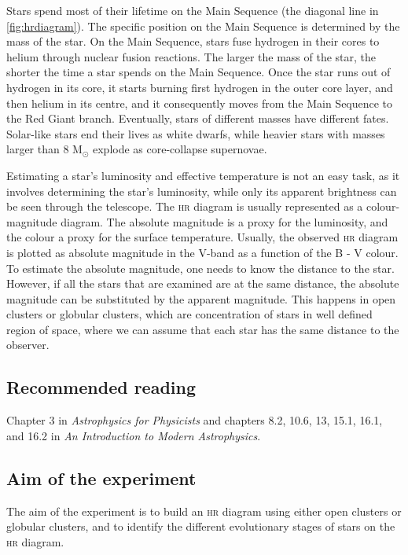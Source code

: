 \documentclass[a4paper, 11pt, fleqn]{memoir}
\begin{document}
Stars spend most of their lifetime on the Main Sequence (the diagonal line in \cref{fig:hrdiagram}).
The specific position on the Main Sequence is determined by the mass of the star.
On the Main Sequence, stars fuse hydrogen in their cores to helium through nuclear fusion reactions.
The larger the mass of the star, the shorter the time a star spends on the Main Sequence.
Once the star runs out of hydrogen in its core, it starts burning first hydrogen in the outer core layer, and then helium in its centre, and it consequently moves from the Main Sequence to the Red Giant branch.
Eventually, stars of different masses have different fates.
Solar-like stars end their lives as white dwarfs, while heavier stars with masses larger than 8 M$_{\odot}$
explode as core-collapse supernovae.

Estimating a star's luminosity and effective temperature is not an easy task, as it involves determining the star's luminosity, while only its apparent brightness can be seen through the telescope.
The \textsc{hr} diagram is usually represented as a colour-magnitude diagram.
The absolute magnitude is a proxy for the luminosity, and the colour a proxy for the surface temperature.
Usually, the observed \textsc{hr} diagram is plotted as absolute magnitude in the V-band as a function of the B - V colour.
To estimate the absolute magnitude, one needs to know the distance to the star.
However, if all the stars that are examined are at the same distance, the absolute magnitude can be substituted by the apparent magnitude.
This happens in open clusters or globular clusters, which are concentration of stars in well defined region of space, where we can assume that each star has the same distance to the observer.

\subsection{Recommended reading}

Chapter 3 in \emph{Astrophysics for Physicists}\autocite{Choudhuri} and chapters 8.2, 10.6, 13, 15.1, 16.1, and 16.2 in \emph{An Introduction to Modern Astrophysics}\autocite{carroll2017introduction}.

\subsection{Aim of the experiment}

The aim of the experiment is to build an \textsc{hr} diagram using either open clusters or globular clusters, and to identify the different evolutionary stages of stars on the \textsc{hr} diagram.
\end{document}
